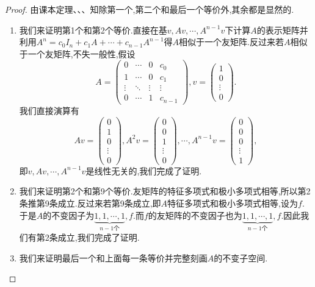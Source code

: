 \documentclass[../../main.tex]{subfiles}
\begin{document}
\begin{proof}
由课本定理、、、知除第一个,第二个和最后一个等价外,其余都是显然的.
\begin{enumerate}[(1)]
\item 我们来证明第1个和第2个等价.直接在基$v,Av,\cdots,A^{n-1}v$下计算$A$的表示矩阵并利用$A^n=c_0I_n+c_1A+\cdots+c_{n-1}A^{n-1}$得$A$相似于一个友矩阵.反过来若$A$相似于一个友矩阵,不失一般性,假设
$$A=\begin{pmatrix}0&\cdots&0&c_0\\1&\cdots&0&c_1\\\vdots&\ddots&\vdots&\vdots\\0&\cdots&1&c_{n-1}\end{pmatrix},v=\begin{pmatrix}1\\0\\\vdots\\0\end{pmatrix}.$$
我们直接演算有
$$Av=\begin{pmatrix}0\\1\\0\\\vdots\\0\end{pmatrix},A^2v=\begin{pmatrix}0\\0\\1\\\vdots\\0\end{pmatrix},\cdots,A^{n-1}v=\begin{pmatrix}0\\0\\0\\\vdots\\1\end{pmatrix},$$
即$v,Av,\cdots,A^{n-1}v$是线性无关的,我们完成了证明.

\item 我们来证明第2个和第9个等价.友矩阵的特征多项式和极小多项式相等,所以第2条推第9条成立.反过来若第9条成立,即$A$特征多项式和极小多项式相等,设为$f$.于是$A$的不变因子为$\underbrace{1,1,\cdots,1}_{n-1个},f$.而$f$的友矩阵的不变因子也为$\underbrace{1,1,\cdots,1}_{n-1个},f$.因此我们有第2条成立,我们完成了证明.

\item 我们来证明最后一个和上面每一条等价并完整刻画$A$的不变子空间.


\end{enumerate}
\end{proof}
\end{document}
